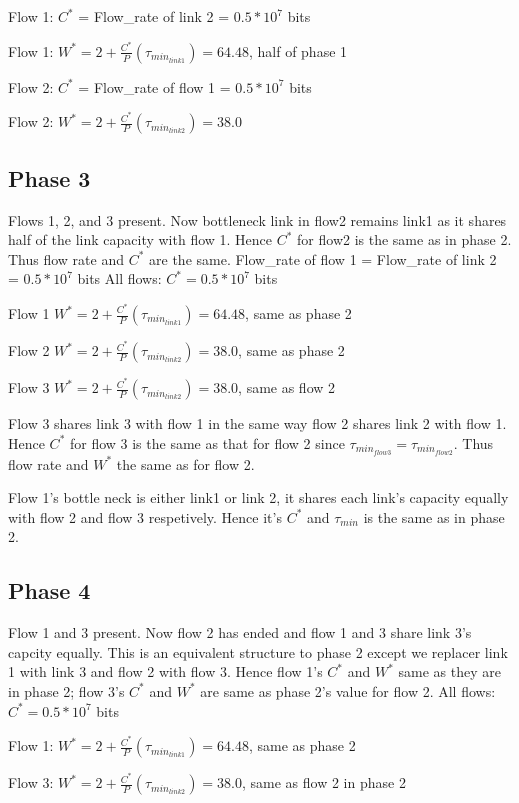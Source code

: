 \documentclass[12pt]{article}
\begin{document}
Flow 1: $C^*$ = Flow\_rate of link 2 = $0.5*10^7$ bits

Flow 1: $W^* = 2+\frac{C^*}{P}(\tau_{min_{link1}}) = 64.48$, half of phase 1

Flow 2: $C^*$ = Flow\_rate of flow 1 = $0.5*10^7$ bits

Flow 2: $W^* = 2+\frac{C^*}{P}(\tau_{min_{link2}}) = 38.0$


\subsection*{Phase 3}
Flows 1, 2, and 3 present. Now bottleneck link in flow2 remains link1 as it shares half of the link capacity with flow 1. Hence $C^*$ for flow2 is the same as in phase 2. Thus flow rate and $C^*$ are the same.
Flow\_rate of flow 1 = Flow\_rate of link 2 = $0.5*10^7$ bits
All flows: $C^* = 0.5*10^7$ bits

Flow 1 $W^* = 2+\frac{C^*}{P}(\tau_{min_{link1}}) = 64.48$, same as phase 2

Flow 2 $W^* = 2+\frac{C^*}{P}(\tau_{min_{link2}}) = 38.0$, same as phase 2

Flow 3 $W^* = 2+\frac{C^*}{P}(\tau_{min_{link2}}) = 38.0$, same as flow 2

Flow 3 shares link 3 with flow 1 in the same way flow 2 shares link 2 with flow 1. Hence $C^*$ for flow 3 is the same as that for flow 2 since $\tau_{min_{flow3}}=\tau_{min_{flow2}}$. Thus flow rate and $W^*$ the same as for flow 2.

Flow 1's bottle neck is either link1 or link 2, it shares each link's capacity equally with flow 2 and flow 3 respetively. Hence it's $C^*$ and $\tau_{min}$ is the same as in phase 2.


\subsection*{Phase 4}
Flow 1 and 3 present.
Now flow 2 has ended and flow 1 and 3 share link 3's capcity equally. This is an equivalent structure to phase 2 except we replacer link 1 with link 3 and flow 2 with flow 3. Hence flow 1's $C^*$ and $W^*$ same as they are in phase 2; flow 3's $C^*$ and $W^*$ are same as phase 2's value for flow 2.
All flows: $C^* = 0.5*10^7$ bits

Flow 1: $W^* = 2+\frac{C^*}{P}(\tau_{min_{link1}}) = 64.48$, same as phase 2

Flow 3: $W^* = 2+\frac{C^*}{P}(\tau_{min_{link2}}) = 38.0$, same as flow 2 in phase 2
\end{document}
